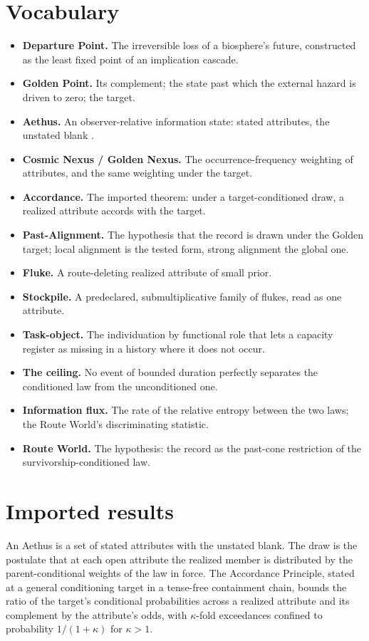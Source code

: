 \section{Vocabulary}\label{sec:vocab}
\begin{itemize}[itemsep=2pt]
\item \textbf{Departure Point.} The irreversible loss of a biosphere's
future, constructed as the least fixed point of an implication cascade.
\item \textbf{Golden Point.} Its complement; the state past which the
external hazard is driven to zero; the target.
\item \textbf{Aethus.} An observer-relative information state: stated
attributes, the unstated blank \cite{Aethus}.
\item \textbf{Cosmic Nexus / Golden Nexus.} The occurrence-frequency
weighting of attributes, and the same weighting under the target.
\item \textbf{Accordance.} The imported theorem: under a target-conditioned
draw, a realized attribute accords with the target.
\item \textbf{Past-Alignment.} The hypothesis that the record is drawn under
the Golden target; local alignment is the tested form, strong alignment
the global one.
\item \textbf{Fluke.} A route-deleting realized attribute of small prior.
\item \textbf{Stockpile.} A predeclared, submultiplicative family of flukes,
read as one attribute.
\item \textbf{Task-object.} The individuation by functional role that lets a
capacity register as missing in a history where it does not occur.
\item \textbf{The ceiling.} No event of bounded duration perfectly separates
the conditioned law from the unconditioned one.
\item \textbf{Information flux.} The rate of the relative entropy between
the two laws; the Route World's discriminating statistic.
\item \textbf{Route World.} The hypothesis: the record as the past-cone
restriction of the survivorship-conditioned law.
\end{itemize}

\section{Imported results}\label{sec:imports}

\begin{definition}
\label{imp:accordance}
An Aethus is a set of stated attributes with the unstated blank. The draw
is the postulate that at each open attribute the realized member is
distributed by the parent-conditional weights of the law in force. The
Accordance Principle, stated at a general conditioning target in a
tense-free containment chain, bounds the ratio of the target's conditional
probabilities across a realized attribute and its complement by the
attribute's odds, with $\kappa$-fold exceedances confined to probability
$1/(1+\kappa)$ for $\kappa>1$.
\end{definition}

